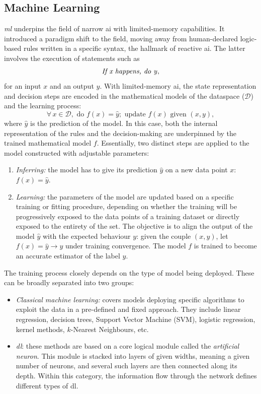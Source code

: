 \subsection{Machine Learning} 
\textit{\gls{ml}} underpins the field of narrow \gls{ai} with limited-memory capabilities. It introduced a paradigm shift to the field, moving away from human-declared logic-based rules written in a specific syntax, the hallmark of reactive \gls{ai}. The latter involves the execution of statements such as \[\textrm{\textit{If x happens, do y}},\] for an input $x$ and an output $y$. With limited-memory \gls{ai}, the state representation and decision steps are encoded in the mathematical models of the dataspace ($\mathcal{D}$) and the learning process: \[\forall\, x \in \mathcal{D}, \textrm{ do }f(x) = \hat{y}; \textrm{ update }f(x) \textrm{ given } (x, y),\] where $\hat{y}$ is the prediction of the model. In this case, both the internal representation of the rules and the decision-making are underpinned by the trained mathematical model $f$. Essentially, two distinct steps are applied to the model constructed with adjustable parameters: 
\begin{enumerate}
    \item \textit{Inferring:} the model has to give its prediction $\hat{y}$ on a new data point $x$: $f(x) = \hat{y}$.
    \item \textit{Learning:} the parameters of the model are updated based on a specific training or fitting procedure, depending on whether the training will be progressively exposed to the data points of a training dataset or directly exposed to the entirety of the set. The objective is to align the output of the model $\hat{y}$ with the expected behaviour $y$: given the couple $(x, y)$, let $f(x) = \hat{y} \rightarrow y$ under training convergence. The model $f$ is trained to become an accurate estimator of the label $y$.
\end{enumerate}
The training process closely depends on the type of model being deployed. These can be broadly separated into two groups:
\begin{itemize}
    \item \textit{Classical machine learning:} covers models deploying specific algorithms to exploit the data in a pre-defined and fixed approach. They include linear regression, decision trees, Support Vector Machine (SVM), logistic regression, kernel methods, $k$-Nearest Neighbours, etc.
    \item \textit{\gls{dl}}: these methods are based on a core logical module called the \textit{artificial neuron}. This module is stacked into layers of given widths, meaning a given number of neurons, and several such layers are then connected along its depth. Within this category, the information flow through the network defines different types of \gls{dl}.
\end{itemize}
